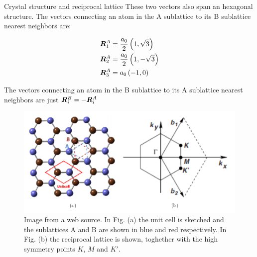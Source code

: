 \begin{subappendices}
\begin{section}{Crystal structure and reciprocal lattice}
These two vectors also span an hexagonal structure. The vectors connecting an atom in the A sublattice to its B sublattice nearest neighbors are:

\begin{align}
\boldsymbol{R}^A_1 &= \frac{a_0}{2} \left( 1, \sqrt{3} \right) \\
\boldsymbol{R}^A_2 &= \frac{a_0}{2} \left( 1, -\sqrt{3} \right) \\
\boldsymbol{R}^A_3 &= a_0 \left( -1, 0 \right)
\end{align}

The vectors connecting an atom in the B sublattice to its A sublattice nearest neighbors are just $\boldsymbol{R}^B_i = -\boldsymbol{R}^A_i$

\begin{figure}
\centering
  \includegraphics[width=0.7\linewidth]{../Figures/honeycomb_lattice.png}
  \caption{Image from a web source. In Fig. (a) the unit cell is sketched and the sublattices A and B are shown in blue and red respectively. In Fig. (b) the reciprocal lattice is shown, toghether with the high symmetry points $K$, $M$ and $K'$.} 
\label{Fig2.2}
\end{figure}
\end{section}
\end{subappendices}
